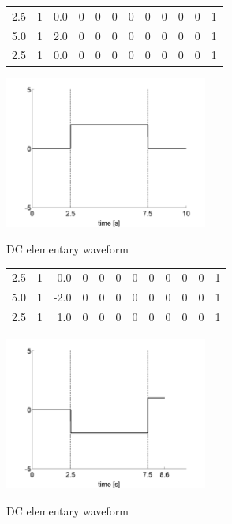 \begin{example}
\begin{center}
\footnotesize\ttfamily
\begin{tabular}{rrrrrrrrrrrr}
2.5 & 1 & 0.0 & 0 & 0 & 0 & 0 & 0 & 0 & 0 &0 & 1 \\
5.0 & 1 & 2.0 & 0 & 0 & 0 & 0 & 0 & 0 & 0 & 0 & 1 \\
2.5 & 1 & 0.0 & 0 & 0 & 0 & 0 & 0 & 0 & 0 & 0 & 1 \\
\end{tabular}
\includegraphics[width=0.5\textwidth]{stimgen/Documentation2009-img001.png}
\end{center}
\caption{DC elementary waveform}
\end{example}

\begin{example}
\begin{center}
\footnotesize\ttfamily
\begin{tabular}{rrrrrrrrrrrr}
2.5 & 1 & 0.0 & 0 & 0 & 0 & 0 & 0 & 0 & 0 & 0 & 1 \\
5.0 & 1 & -2.0 & 0 & 0 & 0 & 0 & 0 &0 & 0 & 0 & 1 \\
2.5 & 1 & 1.0 & 0 & 0 & 0 & 0 & 0 & 0 & 0 & 0 & 1 \\
\end{tabular}
\includegraphics[width=0.5\textwidth]{stimgen/Documentation2009-img002.png}
\end{center}
\caption{DC elementary waveform}
\end{example}

